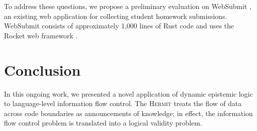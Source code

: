 \documentclass[letterpaper,twocolumn,10pt]{article}
\newcommand{\Hermit}{\textsc{Hermit}\xspace}
\begin{document}
To address these questions, we propose a preliminary evaluation on WebSubmit \cite{schwarzkopf_2022a}, an existing web application for collecting student homework submissions.
WebSubmit consists of approximately 1,000 lines of Rust code and uses the Rocket web framework \cite{benitez_2024a}.

\section{Conclusion}
In this ongoing work, we presented a novel application of dynamic epistemic logic to language-level information flow control.
The \Hermit treats the flow of data across code boundaries as announcements of knowledge; in effect, the information flow control problem is translated into a logical validity problem.



\end{document}
